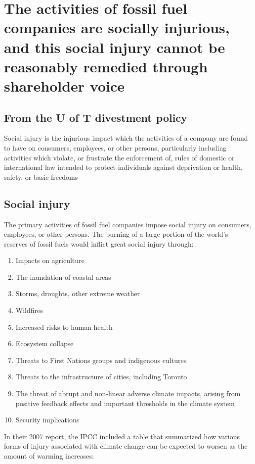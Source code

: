 


		\singlespacing
		\section{The activities of fossil fuel companies are socially injurious, and this social injury cannot be reasonably remedied through shareholder voice}
		\label{sec:SocialInjury}
		\doublespacing



	\subsection{From the U of T divestment policy}



\begin{itquote}
Social injury is the injurious impact which the activities of a company are found to have on consumers, employees, or other persons, particularly including activities which violate, or frustrate the enforcement of, rules of domestic or international law intended to protect individuals against deprivation or health, safety, or basic freedoms
\end{itquote}



	\subsection{Social injury}


The primary activities of fossil fuel companies impose social injury on consumers, employees, or other persons.
The burning of a large portion of the world's reserves of fossil fuels would inflict great social injury through:
\begin{enumerate}
\item Impacts on agriculture
\item The inundation of coastal areas
\item Storms, droughts, other extreme weather
\item Wildfires
\item Increased risks to human health
\item Ecosystem collapse 
\item Threats to First Nations groups and indigenous cultures
\item Threats to the infrastructure of cities, including Toronto
\item The threat of abrupt and non-linear adverse climate impacts, arising from positive feedback effects and important thresholds in the climate system
\item Security implications
\end{enumerate}
In their 2007 report, the IPCC included a table that summarized how various forms of injury associated with climate change can be expected to worsen as the amount of warming increases:

